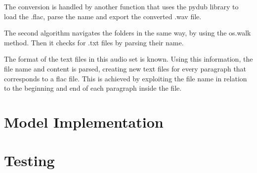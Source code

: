 

The conversion is handled by another function that uses the pydub library to load the .flac, parse the name and   export the converted .wav file.



The second algorithm navigates the folders in the same way, by using the os.walk method. Then it checks for .txt files by parsing their name. 



The format of the text files in this audio set is known. Using this information, the file name and content is parsed, creating new text files for every paragraph that corresponds to a flac file. This is achieved by exploiting the file name in relation to the beginning and end of each paragraph inside the file.
 
 
 
\section{Model Implementation}

\section{Testing}










